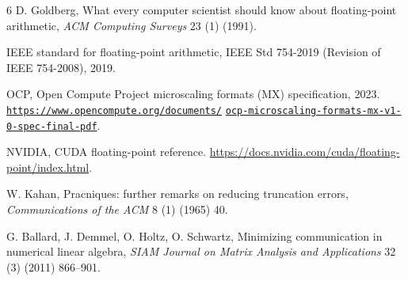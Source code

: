 \begin{chapterbibliography}{6}
  D. Goldberg, What every computer scientist should know about floating-point
  arithmetic, \emph{ACM Computing Surveys} 23 (1) (1991).

  IEEE standard for floating-point arithmetic, IEEE Std 754-2019 (Revision of
  IEEE 754-2008), 2019.

  OCP, Open Compute Project microscaling formats (MX) specification, 2023.\newline
  \href{https://www.opencompute.org/documents/ocp-microscaling-formats-mx-v1-0-spec-final-pdf}%
  {\nolinkurl{https://www.opencompute.org/documents/}}\newline
  \href{https://www.opencompute.org/documents/ocp-microscaling-formats-mx-v1-0-spec-final-pdf}%
  {\nolinkurl{ocp-microscaling-formats-mx-v1-0-spec-final-pdf}}.

  NVIDIA, CUDA floating-point reference.\newline
  \url{https://docs.nvidia.com/cuda/floating-point/index.html}.

  W. Kahan, Pracniques: further remarks on reducing truncation errors,
  \emph{Communications of the ACM} 8 (1) (1965) 40.

  G. Ballard, J. Demmel, O. Holtz, O. Schwartz, Minimizing communication in
  numerical linear algebra, \emph{SIAM Journal on Matrix Analysis and Applications}
  32 (3) (2011) 866--901.
\end{chapterbibliography}
